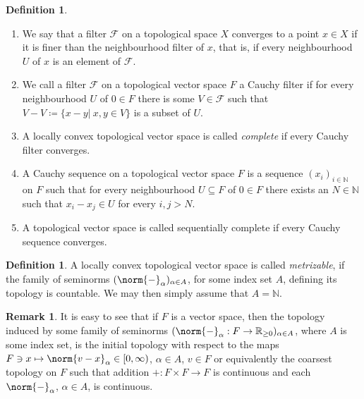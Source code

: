 \documentclass[12pt,a4paper]{article}
\theoremstyle{plain}
\theoremstyle{definition}
\newtheorem{definition}[theorem]{Definition}
\newtheorem{remark}[theorem]{Remark}
\newcommand{\R}{\mathbb{R}}
\newcommand{\N}{\mathbb{N}}
\newcommand{\nnorm}[2]{\norm{#1}_{#2}}
\begin{document}
\begin{definition}
\label{Def:Completeness}
\begin{enumerate}
\item We say that a filter $\mathcal F$ on a topological space $X$ converges to a point $x\in X$ if it is finer than the neighbourhood filter of $x$, that is, if every neighbourhood $U$ of $x$ is an element of $\mathcal F$.

\item We call a filter $\mathcal F$ on a topological vector space $F$ a Cauchy filter if for every neighbourhood $U$ of $0\in F$ there is some $V\in \mathcal F$ such that $V-V\coloneqq \{x-y|~x,y\in V\}$ is a subset of $U$.

\item A locally convex topological vector space is called \textit{complete} if every Cauchy filter converges. 

\item A Cauchy sequence on a topological vector space $F$ is a sequence $(x_i)_{i\in \N}$ on $F$ such that for every neighbourhood $U\subseteq F$ of $0\in F$ there exists an $N\in \N$ such that $x_i-x_j\in U$ for every $i,j>N$.

\item A topological vector space is called sequentially complete if every Cauchy sequence converges.
\end{enumerate}
\end{definition}


\begin{definition}
A locally convex topological vector space is called \textit{metrizable}, if the family of seminorms $(\nnorm{-}{\alpha})_{\alpha\in A}$, for some index set $A$, defining its topology is countable. We may then simply assume that $A=\N$.
\end{definition}


\begin{remark}
It is easy to see that if $F$ is a vector space, then the topology induced by some family of seminorms $(\nnorm{-}{\alpha}:F\to \R_{\geq 0})_{\alpha\in A}$, where $A$ is some index set, is the initial topology with respect to the maps $F\ni x\mapsto \nnorm{v-x}{\alpha}\in [0,\infty)$, $\alpha \in A$, $v\in F$ or equivalently the coarsest topology on $F$ such that addition $+:F\times F\to F$ is continuous and each $\nnorm{-}{\alpha}$, $\alpha\in A$, is continuous.
\end{remark}
\end{document}
